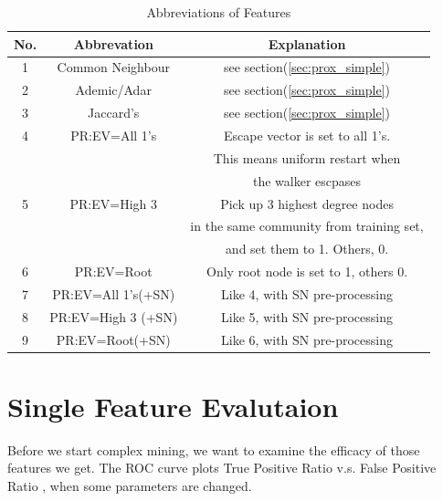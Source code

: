 \documentclass[11pt,a4paper]{article}
\begin{document}
\begin{table}[htb]
\centering
\caption{Abbreviations of Features}
\label{tbl:abbr}
\begin{tabular}{c|c|c}
\hline
No. & Abbrevation & Explanation \\
\hline
1 & Common Neighbour  & see section(\ref{sec:prox_simple}) \\
\hline
2 & Ademic/Adar  &  see section(\ref{sec:prox_simple})\\
\hline
3 & Jaccard’s & see section(\ref{sec:prox_simple}) \\
\hline
4 & PR:EV=All 1’s & Escape vector is set to all 1's.\\
 & & This means uniform restart when \\
 &  & the walker escpases \\
\hline
5 & PR:EV=High 3 & Pick up 3 highest degree nodes \\
 & & in the same community from training set, \\
 & & and set them to 1. Others, 0.  \\
\hline
6 & PR:EV=Root & Only root node is set to 1, others 0. \\
\hline
7 & PR:EV=All 1’s(+SN) & Like 4, with SN pre-processing\\
\hline
8 & PR:EV=High 3 (+SN) & Like 5, with SN pre-processing\\
\hline
9 & PR:EV=Root(+SN) & Like 6, with SN pre-processing\\
\hline
\end{tabular}
\end{table}

\section{Single Feature Evalutaion}

Before we start complex mining, we want to examine the 
efficacy of those features we get. The ROC curve plots 
True Positive Ratio v.s. False Positive Ratio
\cite{wiki_roc}, when some parameters are changed. 
\end{document}
